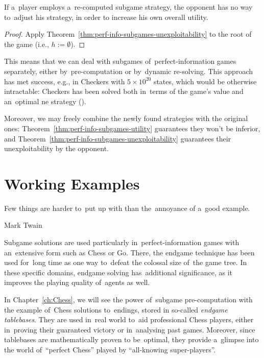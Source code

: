 \begin{cor}
  If a~player employs a~re-computed subgame strategy, the opponent has no way to~adjust his strategy, in order to increase his own overall utility.
\end{cor}
\begin{proof}
  Apply Theorem~\ref{thm:perf-info-subgames-unexploitability} to the root of the game (i.e., $h := \emptyset$).
\end{proof}

This means that we can deal with subgames of~perfect-information games separately, either by~pre-computation or by~dynamic re-solving.
This approach has met success, e.g., in Checkers with $5 \times 10^{20}$ states, which would be otherwise intractable:
Checkers has been solved both in~terms of the game's value and an~optimal \acrshort{ne} strategy (\cite{Schaeffer2007checkers}).

Moreover, we may freely combine the newly found strategies with the original ones:
Theorem~\ref{thm:perf-info-subgames-utility} guarantees they won't be inferior, and Theorem~\ref{thm:perf-info-subgames-unexploitability} guarantees their unexploitability by the opponent.


\section{Working Examples}
\epigraph{
  Few things are harder to~put up with than the~annoyance of a~good example.
}{Mark Twain}
Subgame solutions are used particularly in~perfect-information games with an~extensive form such as Chess or Go.
There, the endgame technique has been used for~long time as one way to~defeat the colossal size of~the game tree.
In these specific domains, endgame solving has~additional significance, as it improves the playing quality of~agents as well.

In Chapter~\ref{ch:Chess}, we will see the power of~subgame pre-computation with the example of~Chess solutions to~endings, stored in so-called \emph{endgame tablebases}.
They are used in~real world to~aid professional Chess players, either in~proving their guaranteed victory or in~analysing past games.
Moreover, since tablebases are mathematically proven to be~optimal, they provide a~glimpse into the world of~``perfect Chess'' played by ``all-knowing super-players''.

